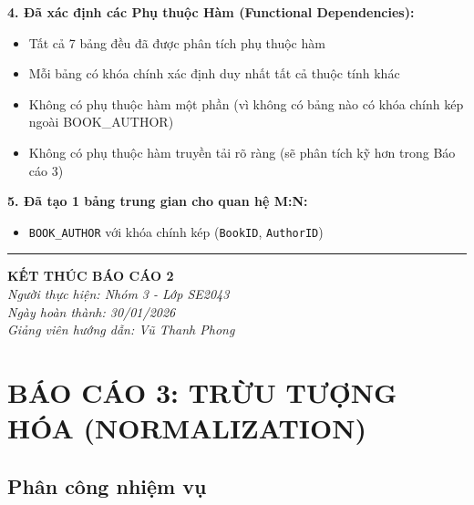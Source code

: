\documentclass[12pt,a4paper]{article}
\begin{document}
\textbf{4. Đã xác định các Phụ thuộc Hàm (Functional Dependencies):}
\begin{itemize}
    \item Tất cả 7 bảng đều đã được phân tích phụ thuộc hàm
    \item Mỗi bảng có khóa chính xác định duy nhất tất cả thuộc tính khác
    \item Không có phụ thuộc hàm một phần (vì không có bảng nào có khóa chính kép ngoài BOOK\_AUTHOR)
    \item Không có phụ thuộc hàm truyền tải rõ ràng (sẽ phân tích kỹ hơn trong Báo cáo 3)
\end{itemize}

\textbf{5. Đã tạo 1 bảng trung gian cho quan hệ M:N:}
\begin{itemize}
    \item \texttt{BOOK\_AUTHOR} với khóa chính kép (\texttt{BookID}, \texttt{AuthorID})
\end{itemize}


\vspace{1cm}
\begin{center}
\rule{0.6\textwidth}{0.4pt}

\textbf{KẾT THÚC BÁO CÁO 2}\\
\vspace{0.5cm}
\textit{Người thực hiện: Nhóm 3 - Lớp SE2043}\\
\textit{Ngày hoàn thành: 30/01/2026}\\
\textit{Giảng viên hướng dẫn: Vũ Thanh Phong}
\end{center}

\newpage
\section{BÁO CÁO 3: TRỪU TƯỢNG HÓA (NORMALIZATION)}

\subsection{Phân công nhiệm vụ}
\end{document}
